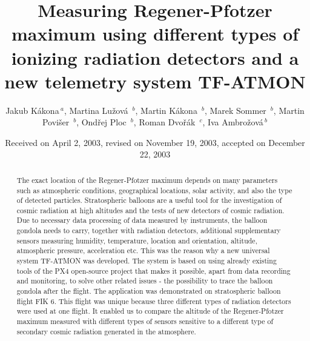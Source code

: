 \documentclass{Rpd}
\begin{document}
\def\Sectitle{Section Title}%

\def\copyrightyear{2021}%

\title[short Title]{Measuring Regener-Pfotzer maximum using different types of ionizing radiation detectors and a new telemetry system TF-ATMON}
\author[\textit{et~al}]{Jakub Kákona\,$^{ a}$,  Martina Lužová \,$^{ b}$, Martin Kákona \,$^{ b}$, Marek Sommer \,$^{ b}$, Martin Povišer \,$^{ b}$, Ondřej Ploc \,$^{ b}$, Roman Dvořák \,$^{ c}$, Iva Ambrožová\,$^{ b}$}
\address{$^{ a}$Czech Technical University in Prague, Faculty of Electrical Engineering, Prague, Czech Republic, $^{ b}$Department of Radiation Dosimetry, Nuclear Physics Institute of the CAS, Na Truhlářce 39/64, 180 00, Prague 8, Czech Republic, $^{ c}$ ThunderFly s.r.o., U Jatek 19, Soběslav  392 01, Czech Republic}

\date{Received on April 2, 2003, revised on November 19, 2003, accepted on December 22, 2003}

\begin{abstract}
The exact location of the Regener-Pfotzer maximum depends on many parameters such as atmospheric conditions, geographical locations, solar activity, and also the type of detected particles. Stratospheric balloons are a useful tool for the investigation of cosmic radiation at high altitudes and the tests of new detectors of cosmic radiation. Due to necessary data processing of data measured by instruments, the balloon gondola needs to carry, together with radiation detectors,  additional supplementary sensors measuring humidity, temperature, location and orientation, altitude, atmospheric pressure, acceleration etc. This was the reason why a new universal system TF-ATMON was developed. The system is based on using already existing tools of the PX4 open-source project that makes it possible, apart from data recording and monitoring, to solve other related issues - the possibility to trace the balloon gondola after the flight. The application was demonstrated on stratospheric balloon flight FIK 6. This flight  was unique because three different types of radiation detectors were used at one flight. It enabled us to compare the altitude of the Regener-Pfotzer maximum measured with different types of sensors sensitive to a different type of secondary cosmic radiation generated in the atmosphere.

\end{abstract}

\maketitle
\end{document}
